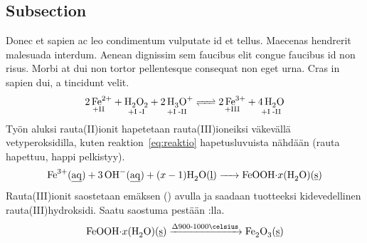 \documentclass[11pt,a4paper,oneside,article]{memoir}
\newcommand\reaction[1]{\begin{equation}\ce{#1}\end{equation}} %
\begin{document}
\subsection{Subsection}
Donec et sapien ac leo condimentum vulputate id et tellus. Maecenas hendrerit malesuada interdum. Aenean dignissim sem faucibus elit congue faucibus id non risus. Morbi at dui non tortor pellentesque consequat non eget urna. Cras in sapien dui, a tincidunt velit.
\reaction{\label{eq:reaktio}$\underset{\text{+II}}{\ce{2Fe^2+}}$ + $\underset{\text{+I\;-I}}{\ce{H2O2}}$ + $\underset{\text{+I\;-II}}{\ce{2H3O^+}}$ <=> $\underset{\text{+III}}{\ce{2Fe^3+}}$ + $\underset{\text{+I\;-II}}{\ce{4H2O}}$}
Työn aluksi rauta(II)ionit hapetetaan rauta(III)ioneiksi väkevällä vetyperoksidilla, kuten reaktion~\ref{eq:reaktio} hapetusluvuista nähdään (rauta hapettuu, happi pelkistyy).  
\reaction{Fe^3+( \emph{aq} ) + 3OH^-( \emph{aq} ) + $(x-1)$H2O( \emph{l} ) -> FeOOH $\cdot$ $x$(H2O)( \emph{s} )}
Rauta(III)ionit saostetaan emäksen () avulla ja saadaan tuotteeksi kidevedellinen rauta(III)hydroksidi. Saatu saostuma pestään :lla.
\reaction{FeOOH $\cdot$ $x$(H2O)( \emph{s} ) ->T[$\Delta$900-1000\celsius] Fe2O3( \emph{s} )}
\end{document}
